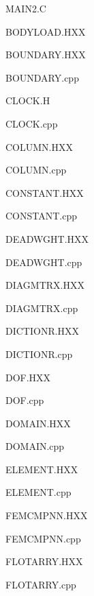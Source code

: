 \documentclass{article}
\begin{document}
{\centering\sf  MAIN2.C\\}

{\centering\sf  BODYLOAD.HXX\\}

{\centering\sf  BOUNDARY.HXX\\}

{\centering\sf  BOUNDARY.cpp\\}

% 
{\centering\sf  CLOCK.H\\}

{\centering\sf  CLOCK.cpp\\}

% 
{\centering\sf  COLUMN.HXX\\}

{\centering\sf  COLUMN.cpp\\}

% 
{\centering\sf  CONSTANT.HXX\\}

{\centering\sf  CONSTANT.cpp\\}

% 
{\centering\sf  DEADWGHT.HXX\\}

{\centering\sf  DEADWGHT.cpp\\}

% 
{\centering\sf  DIAGMTRX.HXX\\}

{\centering\sf  DIAGMTRX.cpp\\}

% 
{\centering\sf  DICTIONR.HXX\\}

{\centering\sf  DICTIONR.cpp\\}

% 
{\centering\sf  DOF.HXX\\}

{\centering\sf  DOF.cpp\\}

% 
{\centering\sf  DOMAIN.HXX\\}

{\centering\sf  DOMAIN.cpp\\}

% 
{\centering\sf  ELEMENT.HXX\\}

{\centering\sf  ELEMENT.cpp\\}

% 
{\centering\sf  FEMCMPNN.HXX\\}

{\centering\sf  FEMCMPNN.cpp\\}

% 
{\centering\sf  FLOTARRY.HXX\\}

{\centering\sf  FLOTARRY.cpp\\}
\end{document}
